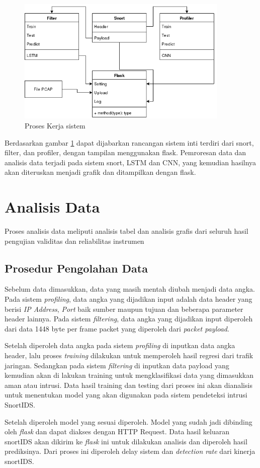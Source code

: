 \documentclass[./skripsi.tex]{subfiles}
\begin{document}
\begin{figure}%
    \centering
    \includegraphics[width=0.9\textwidth]{public/assets/img/SistemTA.png}
    \caption{Proses Kerja sistem}
    \label{fig:proseskerja}
\end{figure}
\par Berdasarkan gambar \ref{fig:proseskerja} dapat dijabarkan rancangan sistem inti terdiri dari snort, filter, dan profiler,  dengan tampilan menggunakan flask. Pemroresan data dan analisis data terjadi pada sistem snort, LSTM dan CNN, yang kemudian hasilnya akan diteruskan menjadi grafik dan ditampilkan dengan flask.
\section{Analisis Data}
\par Proses analisis data meliputi analisis tabel dan analisis grafis dari seluruh hasil pengujian validitas dan reliabilitas instrumen
\subsection{Prosedur Pengolahan Data}
\par Sebelum data dimasukkan, data yang masih mentah diubah menjadi data angka. Pada sistem \textit{profiling}, data angka yang dijadikan input adalah data header yang berisi \textit{IP Address}, \textit{Port} baik sumber maupun tujuan dan beberapa parameter header lainnya. Pada sistem \textit{filtering}, data angka yang dijadikan input diperoleh dari data 1448 byte per frame packet yang diperoleh dari \textit{packet payload}.
\par Setelah diperoleh data angka pada sistem \textit{profiling} di inputkan data angka header, lalu proses \textit{training} dilakukan untuk memperoleh hasil regresi dari trafik jaringan. Sedangkan pada sistem \textit{filtering} di inputkan data payload yang kemudian akan di lakukan training untuk mengklasifikasi data yang dimasukkan aman atau intrusi. Data hasil training dan testing dari proses ini akan dianalisis untuk menentukan model yang akan digunakan pada sistem pendeteksi intrusi SnortIDS.
\par Setelah diperoleh model yang sesuai diperoleh. Model yang sudah jadi dibinding oleh \textit{flask} dan dapat diakses dengan HTTP Request. Data hasil keluaran snortIDS akan dikirim ke \textit{flask} ini untuk dilakukan analisis dan diperoleh hasil prediksinya. Dari proses ini diperoleh delay sistem dan \textit{detection rate} dari kinerja snortIDS.
\end{document}
